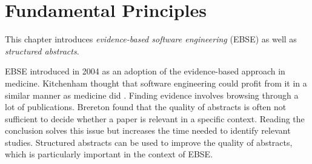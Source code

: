 
\section {Fundamental Principles}
\label{sec:fundamental principles}
This chapter introduces \emph{evidence-based software engineering} (EBSE) as well as \emph{structured abstracts}.

EBSE introduced in 2004 as an adoption of the evidence-based approach in medicine. Kitchenham \etal thought that software engineering could profit from it in a similar manner as medicine did \cite{EBSE}.
Finding evidence involves browsing through a lot of publications. Brereton \etal \cite{Brereton2007} found that the quality of abstracts is often not sufficient to decide whether a paper  is relevant in a specific context. Reading the conclusion solves this issue but increases the time needed to identify relevant studies. Structured abstracts can be used to improve the quality of abstracts, which is particularly important in the context of EBSE.

